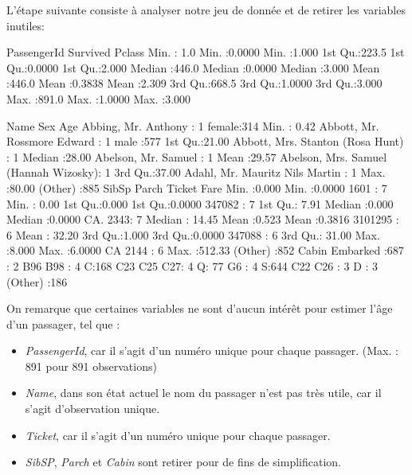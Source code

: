 \documentclass[11pt,french]{report}
\begin{document}
L'étape suivante consiste à analyser notre jeu de donnée et de retirer les variables inutiles:
\begin{Schunk}
\begin{Soutput}
  PassengerId       Survived          Pclass     
 Min.   :  1.0   Min.   :0.0000   Min.   :1.000  
 1st Qu.:223.5   1st Qu.:0.0000   1st Qu.:2.000  
 Median :446.0   Median :0.0000   Median :3.000  
 Mean   :446.0   Mean   :0.3838   Mean   :2.309  
 3rd Qu.:668.5   3rd Qu.:1.0000   3rd Qu.:3.000  
 Max.   :891.0   Max.   :1.0000   Max.   :3.000  
                                                 
                                    Name         Sex           Age       
 Abbing, Mr. Anthony                  :  1   female:314   Min.   : 0.42  
 Abbott, Mr. Rossmore Edward          :  1   male  :577   1st Qu.:21.00  
 Abbott, Mrs. Stanton (Rosa Hunt)     :  1                Median :28.00  
 Abelson, Mr. Samuel                  :  1                Mean   :29.57  
 Abelson, Mrs. Samuel (Hannah Wizosky):  1                3rd Qu.:37.00  
 Adahl, Mr. Mauritz Nils Martin       :  1                Max.   :80.00  
 (Other)                              :885                               
     SibSp           Parch             Ticket         Fare       
 Min.   :0.000   Min.   :0.0000   1601    :  7   Min.   :  0.00  
 1st Qu.:0.000   1st Qu.:0.0000   347082  :  7   1st Qu.:  7.91  
 Median :0.000   Median :0.0000   CA. 2343:  7   Median : 14.45  
 Mean   :0.523   Mean   :0.3816   3101295 :  6   Mean   : 32.20  
 3rd Qu.:1.000   3rd Qu.:0.0000   347088  :  6   3rd Qu.: 31.00  
 Max.   :8.000   Max.   :6.0000   CA 2144 :  6   Max.   :512.33  
                                  (Other) :852                   
         Cabin     Embarked
            :687    :  2   
 B96 B98    :  4   C:168   
 C23 C25 C27:  4   Q: 77   
 G6         :  4   S:644   
 C22 C26    :  3           
 D          :  3           
 (Other)    :186           
\end{Soutput}
\end{Schunk}

On remarque que certaines variables ne sont d'aucun intérêt pour estimer l'âge d'un passager, tel que :
\bigskip

\begin{itemize}
\item \emph{PassengerId}, car il s'agit d'un numéro unique pour chaque passager. (Max. : 891 pour 891 observations)
\item \emph{Name}, dans son état actuel le nom du passager n'est pas très utile, car il s'agit d'observation unique.
\item \emph{Ticket}, car il s'agit d'un numéro unique pour chaque passager.
\item \emph{SibSP}, \emph{Parch} et \emph{Cabin} sont retirer pour de fins de simplification.
\end{itemize}
\end{document}
